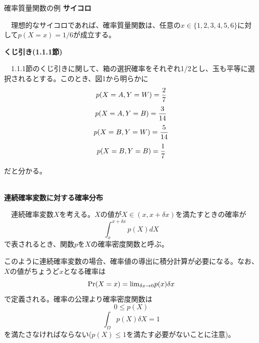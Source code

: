 \documentclass[dvipdfmx, 9pt, a4paper]{jsarticle}
\begin{document}
\begin{itembox}[l]{確率質量関数の例}
{\bf サイコロ} \par
　理想的なサイコロであれば、確率質量関数は、任意の$x \in \{ 1,2,3,4,5,6 \}$に対して$p(X=x)=1/6$が成立する。\bigskip \par
{\bf くじ引き(1.1.1節)}\par
　1.1.1節のくじ引きに関して、箱の選択確率をそれぞれ1/2とし、玉も平等に選択されるとする。このとき、図1から明らかに
\begin{equation}
p(X=A, Y=W)=\frac{2}{7} \notag
\end{equation}
\begin{equation}
p(X=A, Y=B)=\frac{3}{14} \notag
\end{equation}
\begin{equation}
p(X=B, Y=W)=\frac{5}{14} \notag
\end{equation}
\begin{equation}
p(X=B, Y=B)=\frac{1}{7} \notag
\end{equation}

だと分かる。
\end{itembox} \bigskip \\
{\bf 連続確率変数に対する確率分布}
\begin{tcolorbox}[title=確率密度関数]
　連続確率変数$X$を考える。$X$の値が$X \in (x, x+\delta x)$を満たすときの確率が
\begin{equation}
\int_x^{x+\delta x}p(X)dX
\end{equation}
で表されるとき、関数$p$を$X$の確率密度関数と呼ぶ。
\end{tcolorbox}
このように連続確率変数の場合、確率値の導出に積分計算が必要になる。なお、$X$の値がちょうど$x$となる確率は
\begin{equation}
{\rm Pr}(X=x)={\rm lim}_{\delta x \to 0} p(x)\delta x \notag
\end{equation}
で定義される。確率の公理より確率密度関数は
\begin{equation}
0 \leq p(X)
\end{equation}
\begin{equation}
\int_\Omega p(X)\delta X=1
\end{equation}
を満たさなければならない($p(X) \leq 1$を満たす必要がないことに注意)。\bigskip
\end{document}
